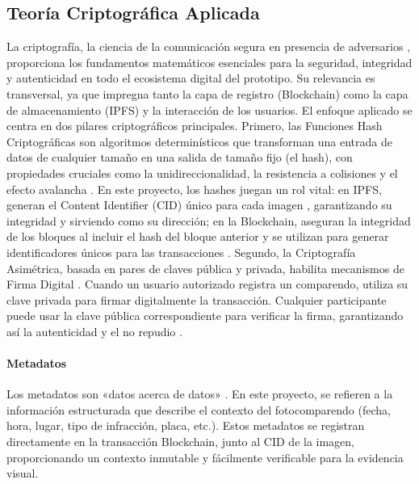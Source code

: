 \subsection{Teoría Criptográfica Aplicada} 
La criptografía, la ciencia de la comunicación segura en presencia de adversarios \parencite{katz2020introduction}, proporciona los fundamentos matemáticos esenciales para la seguridad, integridad y autenticidad en todo el ecosistema digital del prototipo. Su relevancia es transversal, ya que impregna tanto la capa de registro (Blockchain) como la capa de almacenamiento (IPFS) y la interacción de los usuarios. El enfoque aplicado se centra en dos pilares criptográficos principales. Primero, las Funciones Hash Criptográficas son algoritmos determinísticos que transforman una entrada de datos de cualquier tamaño en una salida de tamaño fijo (el hash), con propiedades cruciales como la unidireccionalidad, la resistencia a colisiones y el efecto avalancha \parencite{schneier2007applied,katz2020introduction}. En este proyecto, los hashes juegan un rol vital: en IPFS, generan el Content Identifier (CID) único para cada imagen \parencite{benet2014ipfs}, garantizando su integridad y sirviendo como su dirección; en la Blockchain, aseguran la integridad de los bloques al incluir el hash del bloque anterior y se utilizan para generar identificadores únicos para las transacciones \parencite{nakamoto2008bitcoin}. Segundo, la Criptografía Asimétrica, basada en pares de claves pública y privada, habilita mecanismos de Firma Digital \parencite{diffie2022new,rivest1978method}. Cuando un usuario autorizado registra un comparendo, utiliza su clave privada para firmar digitalmente la transacción. Cualquier participante puede usar la clave pública correspondiente para verificar la firma, garantizando así la autenticidad y el no repudio \parencite{katz2020introduction}. 

\paragraph{Metadatos}  
Los metadatos son «datos acerca de datos» \parencite{gilliland2008setting}. En este proyecto, se refieren a la información estructurada que describe el contexto del fotocomparendo (fecha, hora, lugar, tipo de infracción, placa, etc.). Estos metadatos se registran directamente en la transacción Blockchain, junto al CID de la imagen, proporcionando un contexto inmutable y fácilmente verificable para la evidencia visual. 


